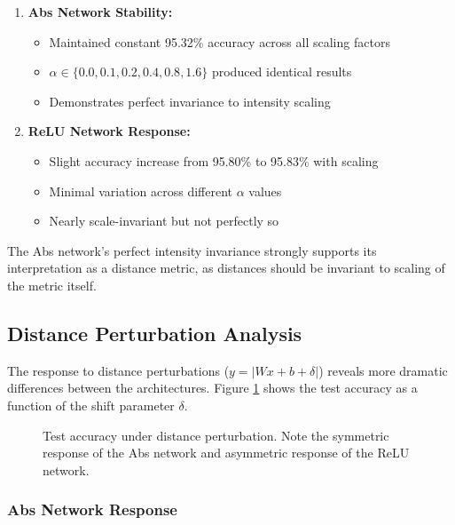 \begin{enumerate}
    \item \textbf{Abs Network Stability:} 
    \begin{itemize}
        \item Maintained constant 95.32\% accuracy across all scaling factors
        \item $\alpha \in \{0.0, 0.1, 0.2, 0.4, 0.8, 1.6\}$ produced identical results
        \item Demonstrates perfect invariance to intensity scaling
    \end{itemize}
    
    \item \textbf{ReLU Network Response:}
    \begin{itemize}
        \item Slight accuracy increase from 95.80\% to 95.83\% with scaling
        \item Minimal variation across different $\alpha$ values
        \item Nearly scale-invariant but not perfectly so
    \end{itemize}
\end{enumerate}

The Abs network's perfect intensity invariance strongly supports its interpretation as a distance metric, as distances should be invariant to scaling of the metric itself.

\subsection{Distance Perturbation Analysis}

The response to distance perturbations ($y = |Wx + b + \delta|$) reveals more dramatic differences between the architectures. Figure \ref{fig:distance} shows the test accuracy as a function of the shift parameter $\delta$.

\begin{figure}[h]
\centering
\caption{Test accuracy under distance perturbation. Note the symmetric response of the Abs network and asymmetric response of the ReLU network.}
\label{fig:distance}
\end{figure}

\subsubsection{Abs Network Response}

